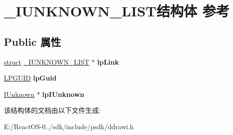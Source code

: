\hypertarget{struct___i_u_n_k_n_o_w_n___l_i_s_t}{}\section{\+\_\+\+I\+U\+N\+K\+N\+O\+W\+N\+\_\+\+L\+I\+S\+T结构体 参考}
\label{struct___i_u_n_k_n_o_w_n___l_i_s_t}
\subsection*{Public 属性}
\begin{DoxyCompactItemize}
\item 
\mbox{\label{struct___i_u_n_k_n_o_w_n___l_i_s_t_ae5640d2577aa0c018b409ebaf2dae94b}} 
\hyperlink{interfacestruct}{struct} \hyperlink{struct___i_u_n_k_n_o_w_n___l_i_s_t}{\+\_\+\+I\+U\+N\+K\+N\+O\+W\+N\+\_\+\+L\+I\+ST} $\ast$ {\bfseries lp\+Link}
\item 
\mbox{\label{struct___i_u_n_k_n_o_w_n___l_i_s_t_ac8d8468059d0fc0d0b2c4887bde6f61d}} 
\hyperlink{interface_g_u_i_d}{L\+P\+G\+U\+ID} {\bfseries lp\+Guid}
\item 
\mbox{\label{struct___i_u_n_k_n_o_w_n___l_i_s_t_aa12dbfbdcb690d172766136c260fee16}} 
\hyperlink{interface_i_unknown}{I\+Unknown} $\ast$ {\bfseries lp\+I\+Unknown}
\end{DoxyCompactItemize}


该结构体的文档由以下文件生成\+:\begin{DoxyCompactItemize}
\item 
E\+:/\+React\+O\+S-\/0../sdk/include/psdk/ddrawi.\+h\end{DoxyCompactItemize}
